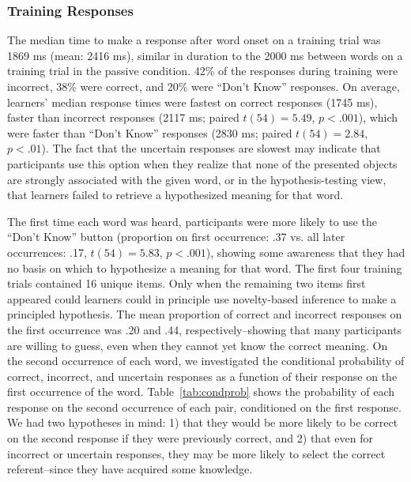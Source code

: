 \documentclass[man,floatsintext]{apa6}
\begin{document}
\subsubsection{Training Responses}

The median time to make a response after word onset on a training trial was 1869 ms (mean: 2416 ms), similar in duration to the 2000 ms between words on a training trial in the passive condition. 42\% of the responses during training were incorrect, 38\% were correct, and 20\% were ``Don't Know'' responses. On average, learners' median response times were fastest on correct responses (1745 ms), faster than incorrect responses (2117 ms; paired $t(54)=5.49$, $p<.001$), which were faster than ``Don't Know'' responses (2830 ms; paired $t(54)=2.84$, $p<.01$). The fact that the uncertain responses are slowest may indicate that participants use this option when they realize that none of the presented objects are strongly associated with the given word, or in the hypothesis-testing view, that learners failed to retrieve a hypothesized meaning for that word.

The first time each word was heard, participants were more likely to use the ``Don't Know'' button (proportion on first occurrence: .37 vs. all later occurrences: .17, $t(54) = 5.83$, $p<.001$), showing some awareness that they had no basis on which to hypothesize a meaning for that word. The first four training trials contained 16 unique items. Only when the remaining two items first appeared could learners could in principle use novelty-based inference to make a principled hypothesis. The mean proportion of correct and incorrect responses on the first occurrence was .20 and .44, respectively--showing that many participants are willing to guess, even when they cannot yet know the correct meaning. On the second occurrence of each word, we investigated the conditional probability of correct, incorrect, and uncertain responses as a function of their response on the first occurrence of the word. Table~\ref{tab:condprob} shows the probability of each response on the second occurrence of each pair, conditioned on the first response.  We had two hypotheses in mind: 1) that they would be more likely to be correct on the second response if they were previously correct, and 2) that even for incorrect or uncertain responses, they may be more likely to select the correct referent--since they have acquired some knowledge. 
\end{document}
